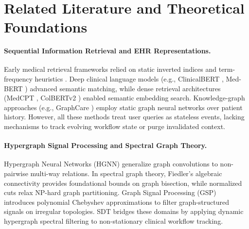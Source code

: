 \documentclass[ijds,dblanonrev]{informs4}
\begin{document}
\section{Related Literature and Theoretical Foundations}
\label{sec:related}

\paragraph{Sequential Information Retrieval and EHR Representations.}
Early medical retrieval frameworks relied on static inverted indices and term-frequency heuristics \citep{baeza1999modern}. Deep clinical language models (e.g., ClinicalBERT \citep{alsentzer2019publicly}, Med-BERT \citep{rasmy2021medbert}) advanced semantic matching, while dense retrieval architectures (MedCPT \citep{jin2023medcpt}, ColBERTv2 \citep{santhanam2022colbertv2}) enabled semantic embedding search. Knowledge-graph approaches (e.g., GraphCare \citep{jiang2024graphcare}) employ static graph neural networks over patient history. However, all these methods treat user queries as stateless events, lacking mechanisms to track evolving workflow state or purge invalidated context.

\paragraph{Hypergraph Signal Processing and Spectral Graph Theory.}
Hypergraph Neural Networks (HGNN) \citep{zhou2006learning,feng2019hypergraph,gao2022hgnnplus} generalize graph convolutions to non-pairwise multi-way relations. In spectral graph theory, Fiedler's algebraic connectivity \citep{fiedler1973algebraic,chung1997spectral} provides foundational bounds on graph bisection, while normalized cuts \citep{shi2000normalized,spielman2007spectral} relax NP-hard graph partitioning. Graph Signal Processing (GSP) \citep{shuman2013emerging,ortega2018graph} introduces polynomial Chebyshev approximations to filter graph-structured signals on irregular topologies. SDT bridges these domains by applying dynamic hypergraph spectral filtering to non-stationary clinical workflow tracking.
\end{document}
